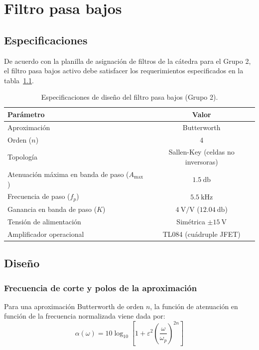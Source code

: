 \chapter{Filtro pasa bajos}
\label{chap:pasa-bajos}

\section{Especificaciones}
\label{sec:pb-especificaciones}

De acuerdo con la planilla de asignación de filtros de la cátedra para el Grupo 2, el filtro pasa bajos activo debe
satisfacer los requerimientos especificados en la tabla~\ref{tab:pb-especificaciones}.

\begin{table}[!ht]
  \centering
  \begin{tabular}{|l|c|}
    \hline
    Parámetro & Valor \\
    \hline
    Aproximación & Butterworth \\
    Orden ($n$) & 4 \\
    Topología & Sallen-Key (celdas no inversoras) \\
    Atenuación máxima en banda de paso ($A_{\max}$) & $\SI{1.5}{\decibel}$ \\
    Frecuencia de paso ($f_p$) & $\SI{5.5}{\kilo\hertz}$ \\
    Ganancia en banda de paso ($K$) & $\SI{4}{\volt/\volt}$ ($\SI{12.04}{\decibel}$) \\
    Tensión de alimentación & Simétrica $\pm\SI{15}{\volt}$ \\
    Amplificador operacional & TL084 (cuádruple JFET) \\
    \hline
  \end{tabular}
  \caption{Especificaciones de diseño del filtro pasa bajos (Grupo 2).}
  \label{tab:pb-especificaciones}
\end{table}

\section{Diseño}
\label{sec:pb-diseno}

\subsection{Frecuencia de corte y polos de la aproximación}
\label{subsec:pb-polos}

Para una aproximación Butterworth de orden $n$, la función de atenuación en función de la frecuencia normalizada
viene dada por:
\begin{equation}
  \alpha(\omega) = 10 \log_{10} \left[ 1 + \varepsilon^2 \left( \frac{\omega}{\omega_p} \right)^{2n} \right]
  \label{eq:pb-atenuacion}
\end{equation}

